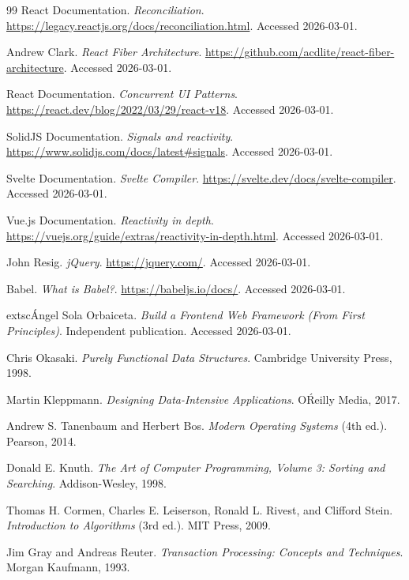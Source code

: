 \documentclass[11pt,oneside]{book}
\begin{document}
\begin{thebibliography}{99}
React Documentation.
\emph{Reconciliation}.
\url{https://legacy.reactjs.org/docs/reconciliation.html}.
Accessed 2026-03-01.

Andrew Clark.
\emph{React Fiber Architecture}.
\url{https://github.com/acdlite/react-fiber-architecture}.
Accessed 2026-03-01.

React Documentation.
\emph{Concurrent UI Patterns}.
\url{https://react.dev/blog/2022/03/29/react-v18}.
Accessed 2026-03-01.

SolidJS Documentation.
\emph{Signals and reactivity}.
\url{https://www.solidjs.com/docs/latest#signals}.
Accessed 2026-03-01.

Svelte Documentation.
\emph{Svelte Compiler}.
\url{https://svelte.dev/docs/svelte-compiler}.
Accessed 2026-03-01.

Vue.js Documentation.
\emph{Reactivity in depth}.
\url{https://vuejs.org/guide/extras/reactivity-in-depth.html}.
Accessed 2026-03-01.

John Resig.
\emph{jQuery}.
\url{https://jquery.com/}.
Accessed 2026-03-01.

Babel.
\emph{What is Babel?}.
\url{https://babeljs.io/docs/}.
Accessed 2026-03-01.

	extsc{Ángel Sola Orbaiceta}.
\emph{Build a Frontend Web Framework (From First Principles)}.
Independent publication.
Accessed 2026-03-01.

Chris Okasaki.
\emph{Purely Functional Data Structures}.
Cambridge University Press, 1998.

Martin Kleppmann.
\emph{Designing Data-Intensive Applications}.
O\'Reilly Media, 2017.

Andrew S. Tanenbaum and Herbert Bos.
\emph{Modern Operating Systems} (4th ed.).
Pearson, 2014.

Donald E. Knuth.
\emph{The Art of Computer Programming, Volume 3: Sorting and Searching}.
Addison-Wesley, 1998.

Thomas H. Cormen, Charles E. Leiserson, Ronald L. Rivest, and Clifford Stein.
\emph{Introduction to Algorithms} (3rd ed.).
MIT Press, 2009.

Jim Gray and Andreas Reuter.
\emph{Transaction Processing: Concepts and Techniques}.
Morgan Kaufmann, 1993.


\end{thebibliography}
\end{document}
